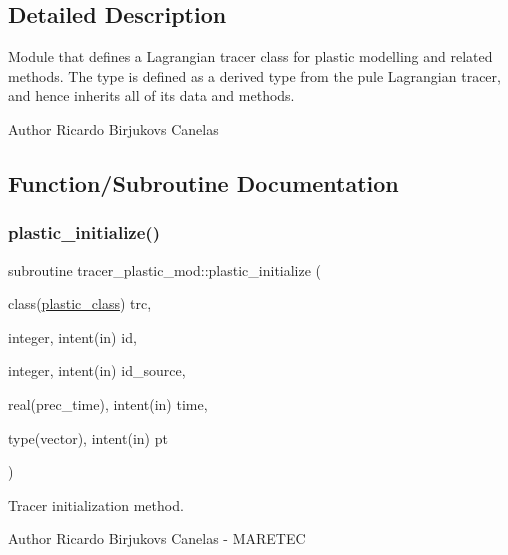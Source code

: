 \subsection{Detailed Description}
Module that defines a Lagrangian tracer class for plastic modelling and related methods. The type is defined as a derived type from the pule Lagrangian tracer, and hence inherits all of it\textquotesingle{}s data and methods. 

\begin{DoxyAuthor}{Author}
Ricardo Birjukovs Canelas 
\end{DoxyAuthor}


\subsection{Function/\+Subroutine Documentation}
\mbox{\label{namespacetracer__plastic__mod_a42882cd86cfe30f341d8150582a664a9}} 
\subsubsection{\texorpdfstring{plastic\+\_\+initialize()}{plastic\_initialize()}}
{\footnotesize\ttfamily subroutine tracer\+\_\+plastic\+\_\+mod\+::plastic\+\_\+initialize (\begin{DoxyParamCaption}\item[{class(\mbox{\hyperlink{structtracer__plastic__mod_1_1plastic__class}{plastic\+\_\+class}})}]{trc,  }\item[{integer, intent(in)}]{id,  }\item[{integer, intent(in)}]{id\+\_\+source,  }\item[{real(prec\+\_\+time), intent(in)}]{time,  }\item[{type(vector), intent(in)}]{pt }\end{DoxyParamCaption})\hspace{0.3cm}{\ttfamily [private]}}



Tracer initialization method. 

\begin{DoxyAuthor}{Author}
Ricardo Birjukovs Canelas -\/ M\+A\+R\+E\+T\+EC
\end{DoxyAuthor}

